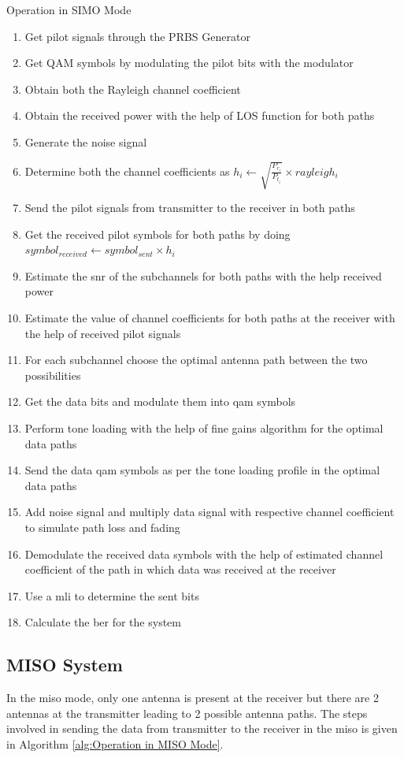 \begin{algorithm}[!htbp]
\caption{Operation in SIMO Mode}
\label{alg:Operation in SIMO Mode}
\begin{enumerate}
\item Get pilot signals through the PRBS Generator
\item Get QAM symbols by modulating the pilot bits with the modulator
\item Obtain both the Rayleigh channel coefficient
\item Obtain the received power with the help of LOS function for both paths
\item Generate the noise signal
\item Determine both the channel coefficients as $h_i \gets \sqrt{\frac{P_{r_i}}{P_{t_i}}} \times rayleigh_i$
\item Send the pilot signals from transmitter to the receiver in both paths
\item Get the received pilot symbols for both paths by doing $symbol_{received} \gets symbol_{sent} \times h_i$
\item Estimate the \acrshort{snr} of the subchannels for both paths with the help received power
\item Estimate the value of channel coefficients for both paths at the receiver with the help of received pilot signals
\item For each subchannel choose the optimal antenna path between the two possibilities
\item Get the data bits and modulate them into \acrshort{qam} symbols
\item Perform tone loading with the help of fine gains algorithm for the optimal data paths
\item Send the data \acrshort{qam} symbols as per the tone loading profile in the optimal data paths
\item Add noise signal and multiply data signal with respective channel coefficient to simulate path loss and fading
\item Demodulate the received data symbols with the help of estimated channel coefficient of the path in which data was received at the receiver
\item Use a \acrlong{mli} to determine the sent bits
\item Calculate the \acrshort{ber} for the system
\end{enumerate}
\end{algorithm} 

\subsection{MISO System}
In the \acrlong{miso} mode, only one antenna is present at the receiver but there are 2 antennas at the transmitter leading to 2 possible antenna paths. The steps involved in sending the data from transmitter to the receiver in the \acrshort{miso} is given in Algorithm \ref{alg:Operation in MISO Mode}.

